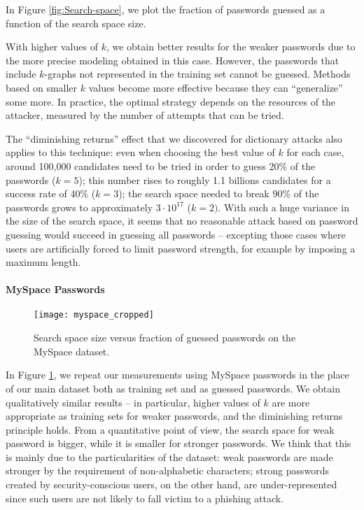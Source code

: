 \documentclass[a4paper,twocolumn]{article}
\begin{document}
In Figure \ref{fig:Search-space}, we plot the fraction of passwords
guessed as a function of the search space size.

With higher values of $k$, we obtain better results for the weaker
passwords due to the more precise modeling obtained in this case.
However, the passwords that include $k$-graphs not represented in
the training set cannot be guessed. Methods based on smaller $k$
values become more effective because they can {}``generalize'' some
more. In practice, the optimal strategy depends on the resources of
the attacker, measured by the number of attempts that can be tried.

The {}``diminishing returns'' effect that we discovered for dictionary
attacks also applies to this technique: even when choosing the best
value of $k$ for each case, around 100,000 candidates need to be
tried in order to guess 20\% of the passwords ($k=5$); this number
rises to roughly 1.1 billions candidates for a success rate of 40\%
($k=3$); the search space needed to break 90\% of the passwords grows
to approximately $3\cdot10^{17}$ ($k=2)$. With such a huge variance
in the size of the search space, it seems that no reasonable attack
based on password guessing would succeed in guessing all passwords
-- excepting those cases where users are artificially forced to limit
password strength, for example by imposing a maximum length.


\paragraph{MySpace Passwords}

\begin{figure}
\begin{centering}
\texttt{[image: myspace\_cropped]}
\par\end{centering}

\caption{\label{fig:Search-space-1}Search space size versus fraction of guessed
passwords on the MySpace dataset.}

\end{figure}


In Figure \ref{fig:Search-space-1}, we repeat our measurements using
MySpace passwords in the place of our main dataset both as training
set and as guessed passwords. We obtain qualitatively similar results
-- in particular, higher values of $k$ are more appropriate as training
sets for weaker passwords, and the diminishing returns principle holds.
From a quantitative point of view, the search space for weak password
is bigger, while it is smaller for stronger passwords. We think that
this is mainly due to the particularities of the dataset: weak passwords
are made stronger by the requirement of non-alphabetic characters;
strong passwords created by security-conscious users, on the other
hand, are under-represented since such users are not likely to fall
victim to a phishing attack.
\end{document}
